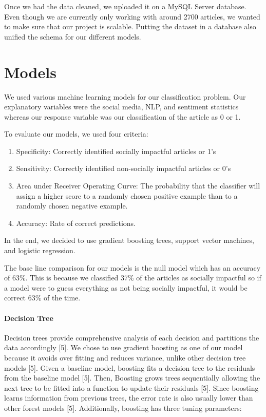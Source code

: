 \documentclass[10pt,letterpaper]{article}
\providecommand{\tightlist}{%
  \setlength{\itemsep}{0pt}\setlength{\parskip}{0pt}}
\begin{document}
Once we had the data cleaned, we uploaded it on a MySQL Server database.
Even though we are currently only working with around 2700 articles, we
wanted to make sure that our project is scalable. Putting the dataset in
a database also unified the schema for our different models.

\section{Models}\label{models}

We used various machine learning models for our classification problem.
Our explanatory variables were the social media, NLP, and sentiment
statistics whereas our response variable was our classification of the
article as 0 or 1.

To evaluate our models, we used four criteria:

\begin{enumerate}
\def\labelenumi{\arabic{enumi}.}
\tightlist
\item
  Specificity: Correctly identified socially impactful articles or 1's
\item
  Sensitivity: Correctly identified non-socially impactful articles or
  0's
\item
  Area under Receiver Operating Curve: The probability that the
  classifier will assign a higher score to a randomly chosen positive
  example than to a randomly chosen negative example.
\item
  Accuracy: Rate of correct predictions.
\end{enumerate}

In the end, we decided to use gradient boosting trees, support vector
machines, and logistic regression.

The base line comparison for our models is the null model which has an
accuracy of 63\%. This is because we classified 37\% of the articles as
socially impactful so if a model were to guess everything as not being
socially impactful, it would be correct 63\% of the time.

\paragraph{Decision Tree}\label{decision-tree}

Decision trees provide comprehensive analysis of each decision and
partitions the data accordingly {[}5{]}. We chose to use gradient
boosting as one of our model because it avoids over fitting and reduces
variance, unlike other decision tree models {[}5{]}. Given a baseline
model, boosting fits a decision tree to the residuals from the baseline
model {[}5{]}. Then, Boosting grows trees sequentially allowing the next
tree to be fitted into a function to update their residuals {[}5{]}.
Since boosting learns information from previous trees, the error rate is
also usually lower than other forest models {[}5{]}. Additionally,
boosting has three tuning parameters:
\end{document}
